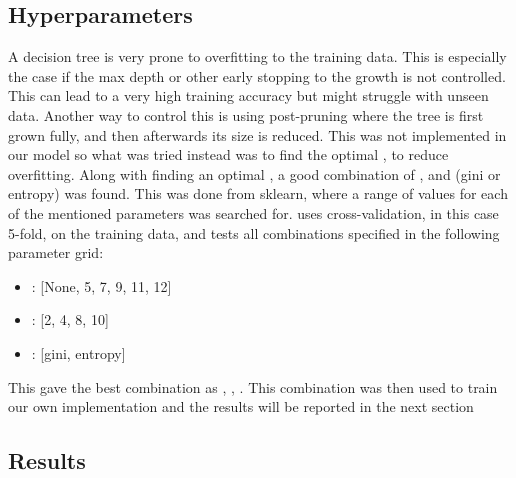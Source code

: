 \subsection{Hyperparameters}
A decision tree is very prone to overfitting to the training data.
This is especially the case if the max depth or other early stopping to the growth is not controlled.
This can lead to a  very high training accuracy but might struggle with unseen data.
Another way to control this is using post-pruning where the tree is first grown fully, and then afterwards its size is reduced.
This was not implemented in our model so what was tried instead was to find the optimal , to reduce overfitting.
Along with finding an optimal , a good combination of ,  and
 (gini or entropy) was found.
This was done  from sklearn, where a range of values for each of the mentioned parameters was searched for.
 uses cross-validation, in this case 5-fold, on the training data, and tests all combinations specified in the following parameter grid:

\begin{center} \begin{minipage}{4in}

\begin{itemize}
    \item {}: [None, 5, 7, 9, 11, 12]
    \item {}: [2, 4, 8, 10]
    \item {}: [gini, entropy] \\
\end{itemize}
            \end{minipage}
\end{center}

This gave the best combination as , , .
This combination was then used to train our own implementation and the results will be reported in the next section


\subsection{Results}








